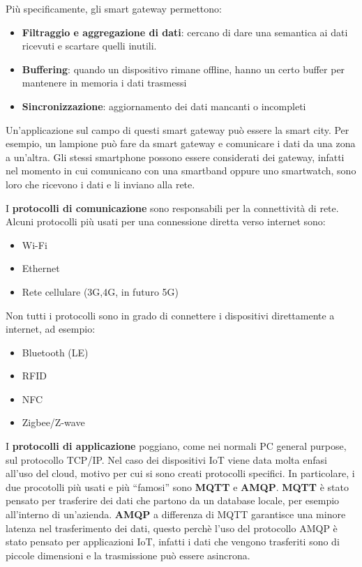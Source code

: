 \documentclass[10pt,a4paper,oneside]{scrbook}
\begin{document}
Più specificamente, gli smart gateway permettono:
\begin{itemize}
    \item \textbf{Filtraggio e aggregazione di dati}: cercano di dare una semantica ai dati ricevuti e scartare quelli inutili.
    \item \textbf{Buffering}: quando un dispositivo rimane offline, hanno un certo buffer per mantenere in memoria i dati trasmessi
    \item \textbf{Sincronizzazione}: aggiornamento dei dati mancanti o incompleti
\end{itemize}
Un'applicazione sul campo di questi smart gateway può essere la smart city. Per esempio, un lampione può fare da smart gateway e comunicare i dati da una zona a un'altra.
Gli stessi smartphone possono essere considerati dei gateway, infatti nel momento in cui comunicano con una smartband oppure uno smartwatch,
sono loro che ricevono i dati e li inviano alla rete.

I \textbf{protocolli di comunicazione} sono responsabili per la connettività di rete.
Alcuni protocolli più usati per una connessione diretta verso internet sono:
\begin{itemize}
    \item Wi-Fi
    \item Ethernet
    \item Rete cellulare (3G,4G, in futuro 5G)
\end{itemize}
Non tutti i protocolli sono in grado di connettere i dispositivi direttamente a internet, ad esempio:
\begin{itemize}
    \item Bluetooth (LE)
    \item RFID
    \item NFC
    \item Zigbee/Z-wave
\end{itemize}
I \textbf{protocolli di applicazione} poggiano, come nei normali PC general purpose, sul protocollo TCP/IP.
Nel caso dei dispositivi IoT viene data molta enfasi all'uso del cloud, motivo per cui si sono creati protocolli specifici.
In particolare, i due procotolli più usati e più ``famosi'' sono \textbf{MQTT} e \textbf{AMQP}.
\textbf{MQTT} è stato pensato per trasferire dei dati che partono da un database locale, per esempio all'interno di un'azienda.
\textbf{AMQP} a differenza di MQTT garantisce una minore latenza nel trasferimento dei dati, questo perchè l'uso del protocollo AMQP 
è stato pensato per applicazioni IoT, infatti i dati che vengono trasferiti sono di piccole dimensioni e la trasmissione può essere asincrona.
\end{document}
